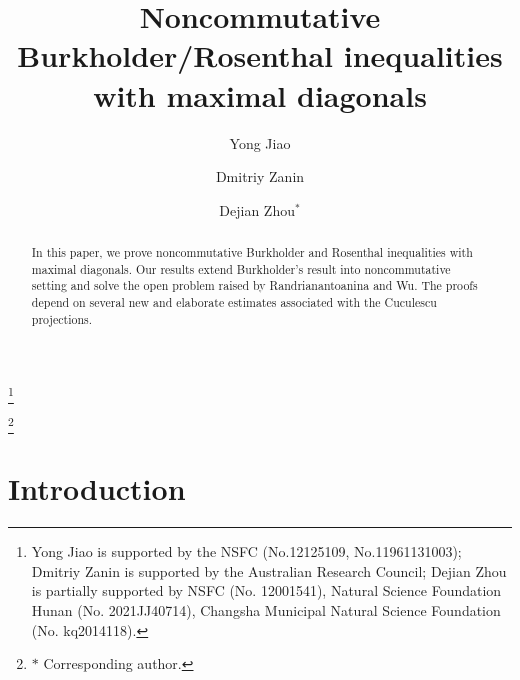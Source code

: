 \documentclass[12pt]{amsart}
\numberwithin{equation}{section}
\begin{document}
\title[Noncommutative Burkholder/Rosenthal inequalities]{Noncommutative Burkholder/Rosenthal inequalities with maximal diagonals}
\author[Jiao]{Yong Jiao  }
\address{School of Mathematics and Statistics, Central South University, HNP-LAMA, Changsha 410075, China}

\author[Zanin]{Dmitriy  Zanin}
\address{School of Mathematics and Statistics, University of NSW, Sydney,  2052, Australia}

\author[Zhou]{Dejian Zhou$^*$}
\address{School of Mathematics and Statistics, HNP-LAMA, Central South University, Changsha 410075, China}



\thanks{Yong Jiao is supported by the NSFC (No.12125109, No.11961131003); Dmitriy Zanin is supported by the Australian Research Council; Dejian Zhou is   partially supported by NSFC (No. 12001541),  Natural Science Foundation Hunan (No. 2021JJ40714), Changsha Municipal Natural Science Foundation (No. kq2014118).}

\thanks{$*$ Corresponding author.}
\begin{abstract}
	In this paper,  we prove noncommutative Burkholder and Rosenthal inequalities with maximal diagonals.
Our results extend Burkholder's result into noncommutative setting and solve the open problem raised by Randrianantoanina and Wu. The proofs depend on several new and elaborate estimates associated with the Cuculescu projections.
\end{abstract}

\maketitle



\section{Introduction}
\end{document}
